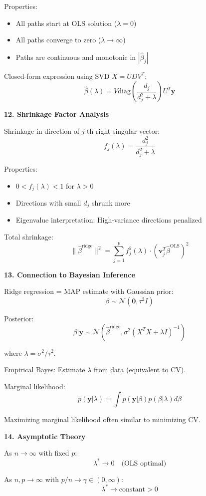 \documentclass[12pt]{article}
\begin{document}
\begin{explanation}
Properties:
\begin{itemize}
\item All paths start at OLS solution ($\lambda = 0$)
\item All paths converge to zero ($\lambda \to \infty$)
\item Paths are continuous and monotonic in $|\hat{\beta}_j|$
\end{itemize}

Closed-form expression using SVD $X = UDV^T$:
\[\hat{\beta}(\lambda) = V\text{diag}\left(\frac{d_j}{d_j^2 + \lambda}\right)U^T\mathbf{y}\]

\textbf{12. Shrinkage Factor Analysis}

Shrinkage in direction of $j$-th right singular vector:
\[f_j(\lambda) = \frac{d_j^2}{d_j^2 + \lambda}\]

Properties:
\begin{itemize}
\item $0 < f_j(\lambda) < 1$ for $\lambda > 0$
\item Directions with small $d_j$ shrunk more
\item Eigenvalue interpretation: High-variance directions penalized
\end{itemize}

Total shrinkage:
\[\|\hat{\beta}^{\text{ridge}}\|^2 = \sum_{j=1}^{p}f_j^2(\lambda) \cdot (\mathbf{v}_j^T\hat{\beta}^{\text{OLS}})^2\]

\textbf{13. Connection to Bayesian Inference}

Ridge regression = MAP estimate with Gaussian prior:
\[\beta \sim \mathcal{N}(\mathbf{0}, \tau^2 I)\]

Posterior:
\[\beta | \mathbf{y} \sim \mathcal{N}(\hat{\beta}^{\text{ridge}}, \sigma^2(X^TX + \lambda I)^{-1})\]

where $\lambda = \sigma^2/\tau^2$.

Empirical Bayes: Estimate $\lambda$ from data (equivalent to CV).

Marginal likelihood:
\[p(\mathbf{y} | \lambda) = \int p(\mathbf{y} | \beta) p(\beta | \lambda) d\beta\]

Maximizing marginal likelihood often similar to minimizing CV.

\textbf{14. Asymptotic Theory}

As $n \to \infty$ with fixed $p$:
\[\lambda^* \to 0 \quad \text{(OLS optimal)}\]

As $n, p \to \infty$ with $p/n \to \gamma \in (0, \infty)$:
\[\lambda^* \to \text{constant} > 0\]


\end{explanation}
\end{document}
